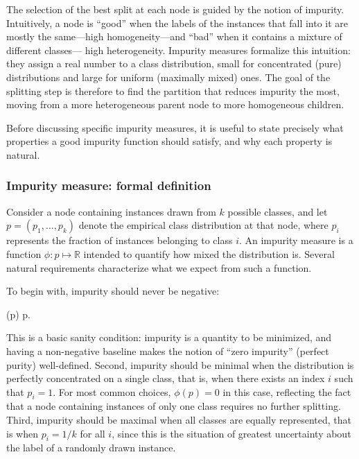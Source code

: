 The selection of the best split at each node is guided by the notion of \alert{impurity}.
Intuitively, a node is ``good'' when the labels of the instances that fall into it are mostly
the same---high homogeneity---and ``bad'' when it contains a mixture of different classes---
high heterogeneity. Impurity measures formalize this intuition: they assign a real number to
a class distribution, small for concentrated (pure) distributions and large for uniform
(maximally mixed) ones. The goal of the splitting step is therefore to find the partition
that reduces impurity the most, moving from a more heterogeneous parent node to more
homogeneous children.

Before discussing specific impurity measures, it is useful to state precisely what
properties a good impurity function should satisfy, and why each property is natural.

\subsubsection*{Impurity measure: formal definition}

Consider a node containing instances drawn from $k$ possible classes, and let
$p = (p_1, \ldots, p_k)$ denote the empirical class distribution at that node, where $p_i$
represents the fraction of instances belonging to class $i$. An impurity measure is a
function $\phi: p \mapsto \mathbb{R}$ intended to quantify how mixed the distribution is.
Several natural requirements characterize what we expect from such a function.

To begin with, impurity should never be negative:
\begin{myequation}
\phi(p)  \quad {} p.
\end{myequation}
This is a basic sanity condition: impurity is a quantity to be minimized, and having a
non-negative baseline makes the notion of ``zero impurity'' (perfect purity) well-defined.
Second, impurity should be minimal when the distribution is perfectly concentrated on a
single class, that is, when there exists an index $i$ such that $p_i = 1$. For most common
choices, $\phi(p) = 0$ in this case, reflecting the fact that a node containing instances
of only one class requires no further splitting. Third, impurity should be maximal when all
classes are equally represented, that is when $p_i = 1/k$ for all $i$, since this is the
situation of greatest uncertainty about the label of a randomly drawn instance.

